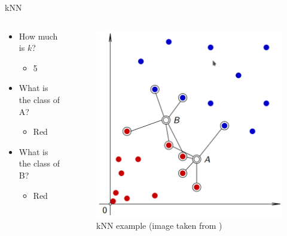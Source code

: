\documentclass[aspectratio=169]{beamer}
\begin{document}
\begin{frame}{kNN}
    \begin{columns}
    \begin{column}{0.5\textwidth}
        \begin{itemize}[<+->]
            \item How much is $k$?
                \begin{itemize}
                    \item 5
                \end{itemize}
            \item What is the class of A?
                \begin{itemize}
                    \item Red
                \end{itemize}
            \item What is the class of B?
                \begin{itemize}
                    \item Red
                \end{itemize}
        \end{itemize}
    \end{column}
    \begin{column}{0.5\textwidth}  %
        \begin{center}
            \begin{figure}
                \includegraphics[scale=0.33]{./images/knn.png}
            \caption{kNN example (image taken from \cite{vi})}
            \end{figure}
        \end{center}
    \end{column}
    \end{columns}
\end{frame}
\end{document}
